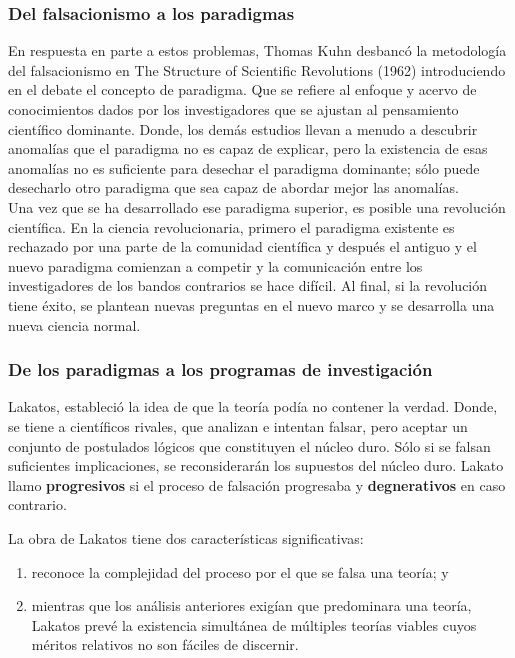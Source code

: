 \documentclass[10pt]{book}
\begin{document}
\subsubsection{Del falsacionismo a los paradigmas}
En respuesta en parte a estos problemas, Thomas Kuhn desbancó la metodología del falsacionismo en The Structure of Scientific Revolutions (1962) introduciendo en el debate el concepto de paradigma. Que se refiere al enfoque y acervo de conocimientos dados por los investigadores que se ajustan al pensamiento científico dominante. Donde, los demás estudios llevan a menudo a descubrir anomalías que el paradigma no es capaz de explicar, pero la existencia de esas anomalías no es suficiente para desechar el paradigma dominante; sólo puede desecharlo otro paradigma que sea capaz de abordar mejor las anomalías.\\

Una vez que se ha desarrollado ese paradigma superior, es posible una revolución científica. En la ciencia revolucionaria, primero el paradigma existente es rechazado por una parte de la comunidad científica y después el antiguo y el nuevo paradigma comienzan a competir y la comunicación entre los investigadores de los bandos contrarios se hace difícil. Al final, si la revolución tiene éxito, se plantean nuevas preguntas en el nuevo marco y se desarrolla una nueva ciencia normal.

\subsubsection{De los paradigmas a los programas de investigación}
Lakatos, estableció la idea de que la teoría podía no contener la verdad. Donde, se tiene a científicos rivales, que analizan e intentan falsar, pero aceptar un conjunto de postulados lógicos que constituyen el núcleo duro. Sólo si se falsan suficientes implicaciones, se reconsiderarán los supuestos del núcleo duro. Lakato llamo \textbf{progresivos} si el proceso de falsación progresaba y \textbf{degnerativos} en caso contrario.

La obra de Lakatos tiene dos características significativas: 
\begin{enumerate}[1.]
    \item  reconoce la complejidad del proceso por el que se falsa una teoría; y 
    \item mientras que los análisis anteriores exigían que predominara una teoría, Lakatos prevé la existencia simultánea de múltiples teorías viables cuyos méritos relativos no son fáciles de discernir.
\end{enumerate}
\end{document}

